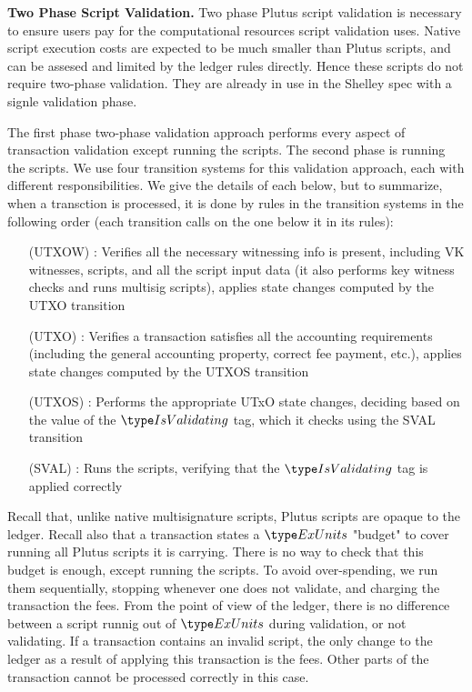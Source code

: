\textbf{Two Phase Script Validation.}
Two phase Plutus script validation is necessary to ensure users pay for the
computational resources script validation uses.
Native script execution costs are expected to be much smaller than Plutus
scripts, and can be assesed and limited by the ledger rules directly.
Hence these scripts do not require two-phase validation. They are already
in use in the Shelley spec with a signle validation phase.

The first phase two-phase validation approach
performs every aspect of transaction validation except running the scripts.
The second phase is running the scripts. We use four transition systems
for this validation approach, each with different responsibilities. We
give the details of each below, but to summarize, when a transction is processed,
it is done by rules in the transition systems in the following order
(each transition calls on the one below it in its rules):

\begin{itemize}
  \item[(UTXOW)] : Verifies all the necessary witnessing info is present, including
  VK witnesses, scripts, and all the script input data (it also performs
  key witness checks and runs multisig scripts), applies state changes
  computed by the UTXO transition
  \item[(UTXO)] : Verifies a transaction satisfies all the accounting requirements
  (including the general accounting property, correct fee payment, etc.),
  applies state changes computed by the UTXOS transition
  \item[(UTXOS)] : Performs the appropriate UTxO state changes, deciding based on the
  value of the $\IsValidating$ tag, which it checks using the SVAL transition
  \item[(SVAL)] : Runs the scripts, verifying that the $\IsValidating$ tag
  is applied correctly
\end{itemize}


Recall that, unlike native
multisignature scripts, Plutus scripts are opaque to the ledger. Recall also
that a transaction states a $\ExUnits$ "budget" to cover running all Plutus
scripts it is carrying. There is no way to check that this budget is enough,
except running the scripts. To avoid over-spending, we run them sequentially,
stopping whenever one does not validate, and charging the transaction the
fees. From the point of view of the ledger, there is no difference
between a script runnig out of $\ExUnits$ during validation, or not validating.
If a transaction contains an invalid script, the only change to the ledger
as a result of applying this transaction is the fees. Other parts of
the transaction cannot be processed correctly in this case.


